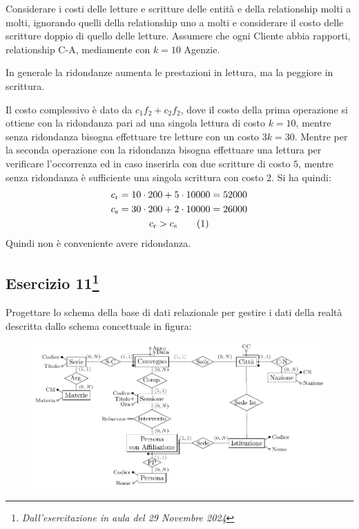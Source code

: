 \documentclass{article}
\newcommand{\tageq}{\tag{\stepcounter{equation}\theequation}}
\begin{document}
Considerare i costi delle letture e scritture delle entità e della relationship molti a molti, ignorando quelli della relationship uno a molti e 
considerare il costo delle scritture doppio di quello delle letture. Assumere che ogni Cliente abbia rapporti, relationship C-A, mediamente con $k=10$ Agenzie. 

In generale la ridondanze aumenta le prestazioni in lettura, ma la peggiore in scrittura. 

Il costo complessivo è dato da $c_1f_2+c_2f_2$, dove il costo della prima operazione si ottiene con la ridondanza pari ad una singola lettura di 
costo $k=10$, mentre senza ridondanza bisogna effettuare tre letture con un costo $3k=30$. 
Mentre per la seconda operazione con la ridondanza bisogna effettuare una lettura per verificare l'occorrenza ed in caso inserirla con due 
scritture di costo $5$, mentre senza ridondanza è sufficiente una singola scrittura con costo $2$. 
Si ha quindi:
\begin{gather*}
    c_{\mathrm{r}}=10\cdot200+5\cdot10000=52000\\
    c_{\mathrm{s}}=30\cdot200+2\cdot10000=26000\\
    c_{\mathrm{r}}>c_{\mathrm{s}}\tageq
\end{gather*}
Quindi non è conveniente avere ridondanza. 

\subsection{Esercizio 11\footnote{\textit{Dall'esercitazione in aula del 29 Novembre 2024}}}

Progettare lo schema della base di dati relazionale per gestire i dati della realtà descritta dallo schema concettuale in figura:

\begin{figure}[H]%
    \centering%
    \includegraphics{esercizio_1_29-11-24.pdf}%
\end{figure}
\end{document}
